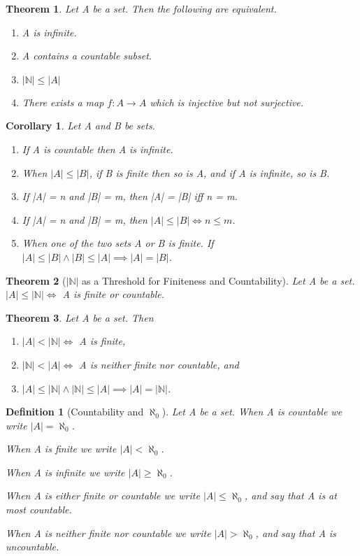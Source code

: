 \documentclass[11pt, oneside]{book}
\theoremstyle{break}
\newtheorem{thm}{Theorem}[section]
\newtheorem{crly}{Corollary}[thm]
\newtheorem{defn}{Definition}[section]
\newcommand{\bb}[1]{\mathbb{#1}}			%
\begin{document}
\begin{thm}
	Let A be a set. Then the following are equivalent.
	\begin{enumerate}
		\item A is infinite.
		\item A contains a countable subset.
		\item $|\bb{N}| \leq |A|$
		\item There exists a map $f: A \to A$ which is injective but not surjective.
	\end{enumerate}
\end{thm}

\begin{crly}
	Let A and B be sets.
	\begin{enumerate}
		\item If A is countable then A is infinite.
		\item When $|A| \leq |B|$, if B is finite then so is A, and if A is infinite, so is B.
		\item If |A| = n and |B| = m, then |A| = |B| iff n = m.
		\item If |A| = n and |B| = m, then $|A| \leq |B| \iff n \leq m$.
		\item When one of the two sets A or B is finite. If $|A| \leq |B| \land |B| \leq |A| \implies |A| = |B|$.
	\end{enumerate}
\end{crly}

\begin{thm}[$|\bb{N}|$ as a Threshold for Finiteness and Countability]
	Let A be a set. $|A| \leq |\bb{N}| \iff$ A is finite or countable.
\end{thm}

\begin{thm}
	Let A be a set. Then
	\begin{enumerate}
		\item $|A| < |\bb{N}| \iff$ A is finite,
		\item $|\bb{N}| < |A| \iff$ A is neither finite nor countable, and
		\item $|A| \leq |\bb{N}| \land |\bb{N}| \leq |A| \implies |A| = |\bb{N}|$.
	\end{enumerate}
\end{thm}

\begin{defn}[Countability and $\aleph_0$]
	Let A be a set. When A is countable we write $|A| = \aleph_0$.

	When A is finite we write $|A| < \aleph_0$.

	When A is infinite we write $|A| \geq \aleph_0$.

	When A is either finite or countable we write $|A| \leq \aleph_0$, and say that A is at most countable.

	When A is neither finite nor countable we write $|A| > \aleph_0$, and say that A is uncountable.
\end{defn}
\end{document}
